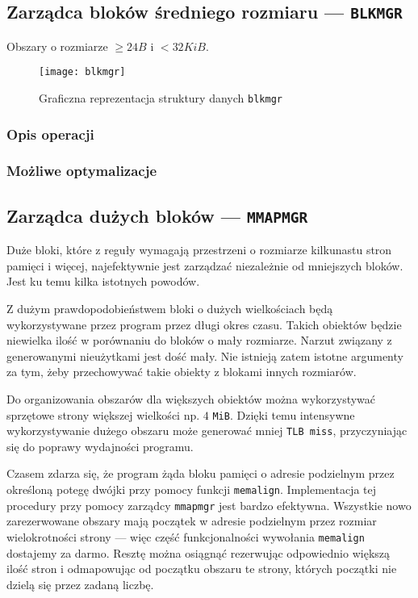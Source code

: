 \documentclass[12pt,a4paper,titlepage,twoside]{mwart}
\begin{document}
\newpage

\subsection{Zarządca bloków średniego rozmiaru --- \texttt{BLKMGR}}

Obszary o rozmiarze $\ge 24B$ i $< 32KiB$.

\begin{figure}[h]
\centering
\texttt{[image: blkmgr]}
\caption{Graficzna reprezentacja struktury danych \texttt{blkmgr}}
\end{figure}

\subsubsection{Opis operacji}

\subsubsection{Możliwe optymalizacje}

\newpage


\subsection{Zarządca dużych bloków --- \texttt{MMAPMGR}}

Duże bloki, które z reguły wymagają przestrzeni o rozmiarze kilkunastu stron
pamięci i więcej, najefektywnie jest zarządzać niezależnie od mniejszych
bloków. Jest ku temu kilka istotnych powodów.

Z dużym prawdopodobieństwem bloki o dużych wielkościach będą wykorzystywane
przez program przez długi okres czasu. Takich obiektów będzie niewielka ilość w
porównaniu do bloków o mały rozmiarze. Narzut związany z generowanymi
nieużytkami jest dość mały. Nie istnieją zatem istotne argumenty za tym, żeby
przechowywać takie obiekty z blokami innych rozmiarów.

Do organizowania obszarów dla większych obiektów można wykorzystywać sprzętowe
strony większej wielkości np. $4$ \verb+MiB+. Dzięki temu intensywne
wykorzystywanie dużego obszaru może generować mniej \texttt{TLB miss},
przyczyniając się do poprawy wydajności programu.

Czasem zdarza się, że program żąda bloku pamięci o adresie podzielnym przez
określoną potegę dwójki przy pomocy funkcji \verb+memalign+. Implementacja tej
procedury przy pomocy zarządcy \texttt{mmapmgr} jest bardzo efektywna.
Wszystkie nowo zarezerwowane obszary mają początek w adresie podzielnym przez
rozmiar wielokrotności strony --- więc część funkcjonalności wywołania
\verb+memalign+ dostajemy za darmo. Resztę można osiągnąć rezerwując
odpowiednio większą ilość stron i odmapowując od początku obszaru te strony,
których początki nie dzielą się przez zadaną liczbę.
\end{document}
